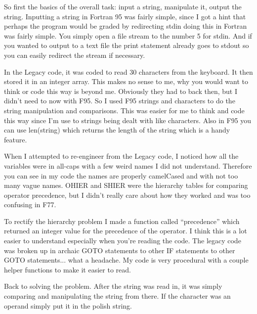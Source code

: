 \documentclass[a4paper,12pt]{article}
\begin{document}
\hspace{10 mm} So first the basics of the overall task: input a string, manipulate it, output the string. Inputting a string in Fortran 95 was fairly simple, since I got a hint that perhaps the program would be graded by redirecting stdin doing this in Fortran was fairly simple. You simply open a file stream to the number 5 for stdin. And if you wanted to output to a text file the print statement already goes to stdout so you can easily redirect the stream if necessary.
	
\hspace{10 mm} In the Legacy code, it was coded to read 30 characters from the keyboard. It then stored it in an integer array. This makes no sense to me, why you would want to think or code this way is beyond me. Obviously they had to back then, but I didn't need to now with F95. So I used F95 strings and characters to do the string manipulation and comparisons. This was easier for me to think and code this way since I'm use to strings being dealt with like characters. Also in F95 you can use len(string) which returns the length of the string which is a handy feature. 
	
\hspace{10 mm} When I attempted to re-engineer from the Legacy code, I noticed how all the variables were in all-caps with a few weird names I did not understand. Therefore you can see in my code the names are properly camelCased and with not too many vague names.  OHIER and SHIER were the hierarchy tables for comparing operator precedence, but I didn't really care about how they worked and was too confusing in F77. 
	
\hspace{10 mm} To rectify the hierarchy problem I made a function called “precedence” which returned an integer value for the precedence of the operator. I think this is a lot easier to understand especially when you're reading the code. The legacy code was broken up in archaic GOTO statements to other IF statements to other GOTO statements... what a headache. My code is very procedural with a couple helper functions to make it easier to read.
	
\hspace{10 mm} Back to solving the problem. After the string was read in, it was simply comparing and manipulating the string from there. If the character was an operand simply put it in the polish string.
	
\end{document}

